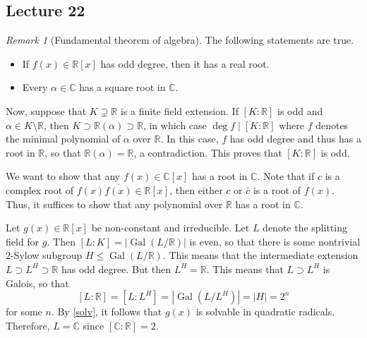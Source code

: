\documentclass[10pt,letterpaper,cm]{nupset}
\theoremstyle{definition}
\theoremstyle{theorem}
\theoremstyle{remark}
\newtheorem{remark}[definition]{Remark}
\newcommand{\C}{\mathbb C}
\newcommand{\R}{\mathbb R}
\newcommand{\1}{\mathbf{1}}
\newcommand{\0}{\vec 0}
\DeclareMathOperator{\gal}{Gal}
\begin{document}
\subsection{Lecture 22}


\begin{remark}[Fundamental theorem of algebra]
The following statements are true.
\begin{itemize}
\item If $f(x) \in \R[x]$ has odd degree, then it has a real root.
\item Every $\alpha \in \C$ has a square root in $\C$.
\end{itemize}
Now, suppose that $K \supsetneq \R$ is a finite field extension. If $[K : \R]$ is odd and $\alpha \in K \setminus \R$, then $K \supset \R(\alpha) \supset \R$, in which case $\deg{f} \mid [K : \R]$ where $f$ denotes the minimal polynomial of $\alpha$ over $\R$.  In this case, $f$ has odd degree and thus has a root in $\R$, so that $\R(\alpha) = \R$, a contradiction. This proves that $[K : \R]$ is odd.

We want to show that any $f(x) \in \C[x]$ has a root in $\C$. Note that if $c$ is a complex root of $f(x)\overline{f(x)} \in \R[x]$, then either $c$ or $\bar{c}$ is a root of $f(x)$.  Thus, it suffices to show that any polynomial over $\R$ has a root in $\C$.

Let $g(x) \in \R[x]$ be non-constant and irreducible. Let $L$ denote the splitting field for $g$. Then $[L :K] = |\gal(L/\R)|$ is even, so that there is some nontrivial $2$-Sylow subgroup $H \leq \gal(L/\R)$. This means that the intermediate extension $L \supset L^H \supset \R$ has odd degree. But then $L^H = \R$. This means that $L \supset L^H$ is Galois, so that $$[L: \R] = [L: L^H] = |\gal(L/L^H)| = |H| = 2^n$$ for some $n$. By \cref{solv}, it follows that $g(x)$ is solvable in quadratic radicals. Therefore, $L = \C$ since $[\C : \R] = 2$. 
\end{remark}
\end{document}
